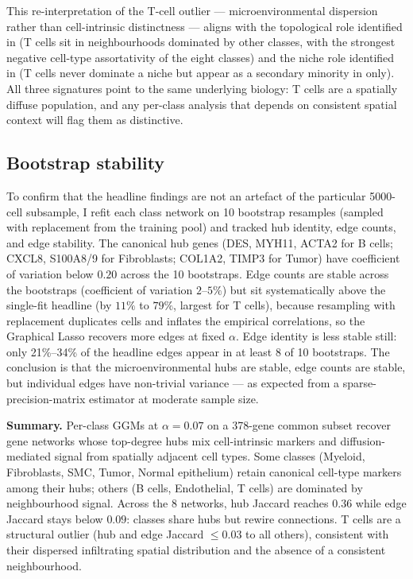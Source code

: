 This re-interpretation of the T-cell outlier --- microenvironmental dispersion rather than cell-intrinsic distinctness --- aligns with the topological role identified in  (T cells sit in neighbourhoods dominated by other classes, with the strongest negative cell-type assortativity of the eight classes) and the niche role identified in  (T cells never dominate a niche but appear as a secondary minority in  only). All three signatures point to the same underlying biology: T cells are a spatially diffuse population, and any per-class analysis that depends on consistent spatial context will flag them as distinctive.

\subsection*{Bootstrap stability}

To confirm that the headline findings are not an artefact of the particular 5000-cell subsample, I refit each class network on 10 bootstrap resamples (sampled with replacement from the training pool) and tracked hub identity, edge counts, and edge stability. The canonical hub genes (DES, MYH11, ACTA2 for B cells; CXCL8, S100A8/9 for Fibroblasts; COL1A2, TIMP3 for Tumor) have coefficient of variation below $0.20$ across the 10 bootstraps. Edge counts are stable across the bootstraps (coefficient of variation $2$--$5\%$) but sit systematically above the single-fit headline (by $11\%$ to $79\%$, largest for T cells), because resampling with replacement duplicates cells and inflates the empirical correlations, so the Graphical Lasso recovers more edges at fixed $\alpha$. Edge identity is less stable still: only 21\%--34\% of the headline edges appear in at least 8 of 10 bootstraps. The conclusion is that the microenvironmental hubs are stable, edge counts are stable, but individual edges have non-trivial variance --- as expected from a sparse-precision-matrix estimator at moderate sample size.

\medskip

\noindent\textbf{Summary.} Per-class GGMs at $\alpha = 0.07$ on a 378-gene common subset recover gene networks whose top-degree hubs mix cell-intrinsic markers and diffusion-mediated signal from spatially adjacent cell types. Some classes (Myeloid, Fibroblasts, SMC, Tumor, Normal epithelium) retain canonical cell-type markers among their hubs; others (B cells, Endothelial, T cells) are dominated by neighbourhood signal. Across the 8 networks, hub Jaccard reaches $0.36$ while edge Jaccard stays below $0.09$: classes share hubs but rewire connections. T cells are a structural outlier (hub and edge Jaccard $\leq 0.03$ to all others), consistent with their dispersed infiltrating spatial distribution and the absence of a consistent neighbourhood.